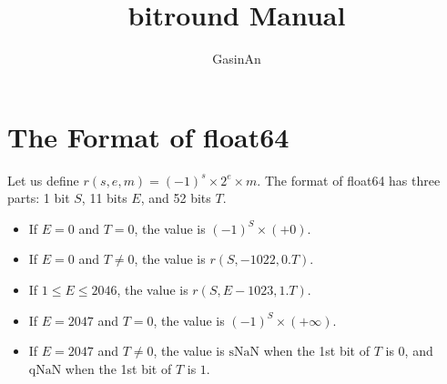\documentclass[a4paper,12pt]{article}
\title{bitround Manual}
\author{GasinAn}
\begin{document}
    \maketitle

    \tableofcontents

    \section{The Format of float64}

    Let us define $r(s,e,m)=(-1)^s\times2^e\times m$. The format of float64 has three parts: 1 bit $S$, 11 bits $E$, and 52 bits $T$.
    \begin{itemize}
        \item If $E=0$ and $T=0$, the value is $(-1)^S\times(+0)$.
        \item If $E=0$ and $T\neq0$, the value is $r(S,-1022,0.T)$.
        \item If $1\leq E\leq2046$, the value is $r(S,E-1023,1.T)$.
        \item If $E=2047$ and $T=0$, the value is $(-1)^S\times(+\infty)$.
        \item If $E=2047$ and $T\neq0$, the value is $\text{sNaN}$ when the 1st bit of $T$ is $0$, and $\text{qNaN}$ when the 1st bit of $T$ is $1$.
    \end{itemize}
\end{document}
